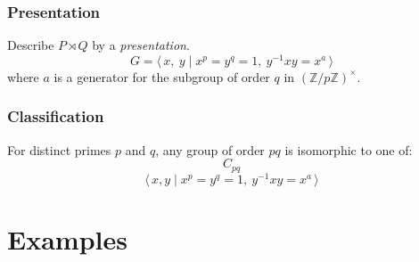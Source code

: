 \documentclass[12pt]{beamer}
\newcommand{\gen}[1]{\langle\,#1\,\rangle}
\begin{document}
\begin{frame}
\frametitle{Presentation}
Describe \(P \rtimes Q\) by a \emph{presentation}.
\[ G = \gen{x,\ y \mid x^p = y^q = 1,\ y^{-1}xy = x^a} \]
where \(a\) is a generator for the subgroup of order \(q\) in \({(\mathbb{Z}/p\mathbb{Z})}^\times\).
\end{frame}

\begin{frame}
\frametitle{Classification}
For distinct primes \(p\) and \(q\), any group of order \(pq\) is isomorphic to one of:
\[C_{pq}\]
\[\gen{x, y \mid x^p = y^q = 1,\ y^{-1}xy = x^a} \tag*{additionally, if \(q \mid p-1\)}\]
\end{frame}


\section{Examples}
\end{document}
